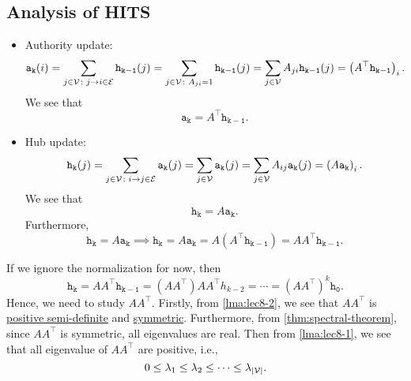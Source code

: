 \subsection{Analysis of HITS}
\begin{itemize}
	\item Authority update:
	      \[
		      \mathtt{a_k(\mathnormal{i})}  = \sum\limits_{j\in \mathcal{V}\colon j\to i\in \mathcal{E}}\mathtt{h_{k-1}(\mathnormal{j})}
		      =\sum\limits_{j\in\mathcal{V}\colon A_{ji} = 1}\mathtt{h_{k-1}(\mathnormal{j})}
		      =\sum\limits_{j\in\mathcal{V}}A_{ji}\mathtt{h_{k-1}(\mathnormal{j})}
		      = \left(A^{\top} \mathtt{h_{k-1}}\right)_i.
	      \]
	      We see that
	      \[
		      \mathtt{a_k} = A^{\top}\mathtt{h_{k-1}}.
	      \]
	\item Hub update:
	      \[
		      \mathtt{h_k(\mathnormal{j})} = \sum\limits_{j\in\mathcal{V}\colon i\to j\in\mathcal{E}} \mathtt{a_k(\mathnormal{j})}
		      = \sum\limits_{j\in\mathcal{V}} \mathtt{a_k(\mathnormal{j})}
		      = \sum\limits_{j\in\mathcal{V} }A_{ij}\mathtt{a_k(\mathnormal{j})}
		      = \left(A\mathtt{a_k}\right)_i.
	      \]
	      We see that
	      \[
		      \mathtt{h_{k}} = A \mathtt{a_{k}}.
	      \]
	      Furthermore,
	      \[
		      \mathtt{h_k} = A\mathtt{a_k}\implies \mathtt{h_k}= A\mathtt{a_k} = A(A^{\top}\mathtt{h_{k-1}}) = A A^{\top} \mathtt{h_{k-1}}.
	      \]
\end{itemize}
If we ignore the normalization for now, then
\[
	\mathtt{h_k} = A A^{\top}\mathtt{h_{k-1}} = (A A^{\top})A A^{\top} h_{k-2} = \cdots = (A A^{\top})^k \mathtt{h_0}.
\]
Hence, we need to study \(A A^{\top}\). Firstly, from \autoref{lma:lec8-2}, we see that \(A A^{\top} \) is \hyperref[def:positive-semi-definite]{positive semi-definite}
and \hyperref[def:symmetric-matrix]{symmetric}. Furthermore, from \autoref{thm:spectral-theorem}, since \(A A^{\top} \) is symmetric, all eigenvalues are real. Then
from \autoref{lma:lec8-1}, we see that all eigenvalue of \(A A^{\top} \) are positive, i.e.,
\[
	0 \leq \lambda_1 \leq \lambda_2 \leq \cdots \leq \lambda_{\left\vert \mathcal{\MakeUppercase{v}} \right\vert } .
\]

